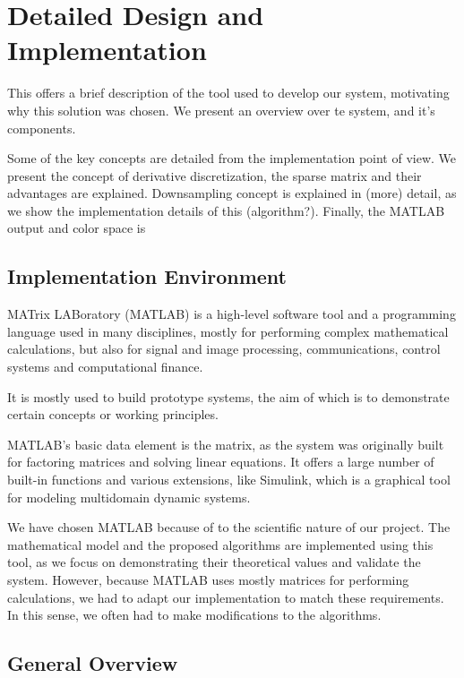 \documentclass[12pt,a4paper,twoside]{report}
\begin{document}
{\chapter{Detailed Design and Implementation}


This offers a brief description of the tool used to develop our system, motivating why this solution was chosen. We present an overview over te system, and it's components.

Some of the key concepts are detailed from the implementation point of view. We present the concept of derivative discretization, the sparse matrix and their advantages are explained. 
Downsampling concept is explained in (more) detail, as we show the implementation details of this (algorithm?).
Finally, the MATLAB output and color space is

\section{Implementation Environment}

MATrix LABoratory (MATLAB) is a high-level software tool  and a programming language used in many disciplines, mostly for performing complex mathematical calculations, but also for  signal and image processing, communications, control systems and computational finance. 


It is mostly used to build prototype systems, the aim of which is to demonstrate certain concepts or working principles.


MATLAB's basic data element is the matrix, as the system was originally built for factoring matrices and solving linear equations.  It offers a large number of built-in functions and various extensions, like Simulink, which is a graphical tool for modeling multidomain dynamic systems.


We have chosen MATLAB because of to the scientific nature of our project. The mathematical model and the proposed algorithms are implemented using this tool, as we focus on demonstrating their theoretical values and validate the system.
However, because MATLAB uses mostly matrices for performing calculations, we had to adapt our implementation to match these requirements. In this sense, we often had to make modifications to the algorithms.



\section{General Overview}

}
\end{document}
